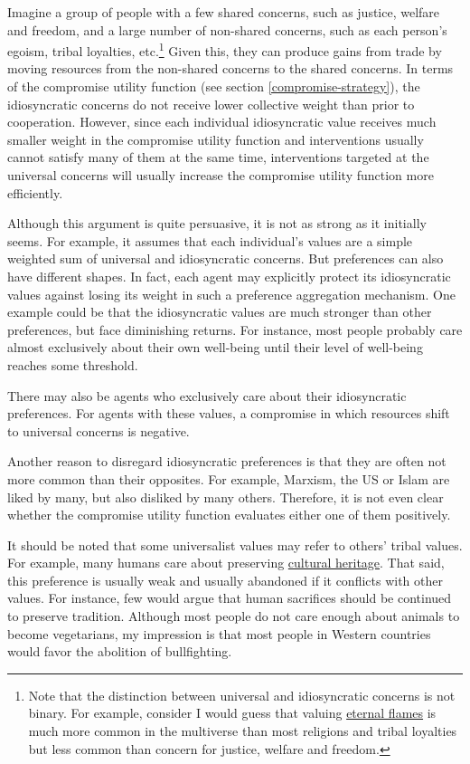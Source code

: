Imagine a group of people with a few shared concerns, such as justice,
welfare and freedom, and a large number of non-shared concerns, such as
each person's egoism, tribal loyalties, etc.\footnote{Note that the
  distinction between universal and idiosyncratic concerns is not
  binary. For example, consider I would guess that valuing
  \href{https://en.wikipedia.org/wiki/Eternal_flame}{eternal
  flames} is much more common in the multiverse than most religions and
  tribal loyalties but less common than concern for justice, welfare and
  freedom.} Given this, they can produce gains from trade by moving
resources from the non-shared concerns to the shared concerns. In terms
of the compromise utility function (see section
\ref{compromise-strategy}), the idiosyncratic concerns do not receive lower
collective weight than prior to cooperation. However, since each
individual idiosyncratic value receives much smaller weight in the
compromise utility function and interventions usually cannot satisfy
many of them at the same time, interventions targeted at the universal
concerns will usually increase the compromise utility function more
efficiently.

Although this argument is quite persuasive, it is not as strong as it
initially seems. For example, it assumes that each individual's values
are a simple weighted sum of universal and idiosyncratic concerns. But
preferences can also have different shapes. In fact, each agent may
explicitly protect its idiosyncratic values against losing its weight in
such a preference aggregation mechanism. One example could be that the
idiosyncratic values are much stronger than other preferences, but face
diminishing returns. For instance, most people probably care almost
exclusively about their own well-being until their level of well-being
reaches some threshold.

There may also be agents who exclusively care about their idiosyncratic
preferences. For agents with these values, a compromise in which
resources shift to universal concerns is negative.

Another reason to disregard idiosyncratic preferences is that they are
often not more common than their opposites. For example, Marxism, the US
or Islam are liked by many, but also disliked by many others. Therefore,
it is not even clear whether the compromise utility function evaluates
either one of them positively.

It should be noted that some universalist values may refer to others'
tribal values. For example, many humans care about preserving
\href{https://en.wikipedia.org/wiki/Cultural_heritage}{cultural
heritage}. That said, this preference is usually weak and usually
abandoned if it conflicts with other values. For instance, few would
argue that human sacrifices should be continued to preserve tradition.
Although most people do not care enough about animals to become
vegetarians, my impression is that most people in Western countries
would favor the abolition of bullfighting.

